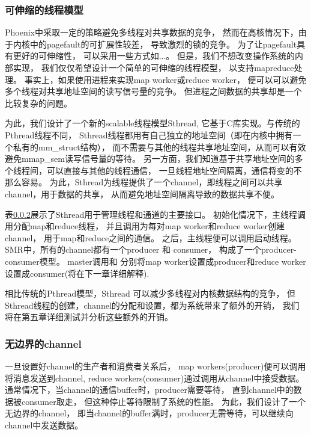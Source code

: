 \subsubsection{可伸缩的线程模型}
Phoenix中采取一定的策略避免多线程对共享数据的竞争，
然而在高核情况下，由于内核中的pagefault的可扩展性较差，
导致激烈的锁的竞争。
为了让pagefault具有更好的可伸缩性，
可以采用一些方式如\cite{}...。
但是，我们不想改变操作系统的内部实现，
我们仅仅希望设计一个简单的可伸缩的线程模型，
以支持mapreduce处理。
事实上，如果使用进程来实现map worker或reduce worker，
便可以可以避免多个线程对共享地址空间的读写信号量的竞争。
但进程之间数据的共享却是一个比较复杂的问题。

为此，我们设计了一个新的scalable线程模型Sthread,
它基于C库实现。与传统的Pthread线程不同，
Sthread线程都用有自己独立的地址空间（即在内核中拥有一个私有的mm\_struct结构），
而不需要与其他的线程共享地址空间，从而可以有效避免mmap\_sem读写信号量的等待。
另一方面，我们知道基于共享地址空间的多个线程间，可以直接与其他的线程通信，
一旦线程地址空间隔离，通信将变的不那么容易。
为此，Sthread为线程提供了一个channel，即线程之间可以共享channel，用于数据的共享，
从而避免地址空间隔离导致的数据共享不便。

表\ref{}展示了Sthread用于管理线程和通道的主要接口。
初始化情况下，主线程调用分配map和reduce线程，
并且调用为每对map worker和reduce worker创建channel，
用于map和reduce之间的通信。
之后，主线程便可以调用启动线程。
SMR中，所有的channel都有一个producer 和 consumer，
构成了一个producer-consumer模型。
master调用和
分别将map worker设置成producer和reduce worker设置成consumer(将在下一章详细解释).

相比传统的Pthread模型，Sthread 可以减少多线程对内核数据结构的竞争，
但Sthread线程的创建，channel的分配和设置，都为系统带来了额外的开销，
我们将在第五章详细测试并分析这些额外的开销。


\subsubsection{无边界的channel}
一旦设置好channel的生产者和消费者关系后，
map workers(producer)便可以调用将消息发送到channel,
reduce workers(consumer)通过调用从channel中接受数据。
通常情况下，当channel的通信buffer时，producer需要等待，
直到channel中的数据被consumer取走，
但这种停止等待限制了系统的性能。
为此，我们设计了一个无边界的channel，
即当channel的buffer满时，producer无需等待，可以继续向channel中发送数据。

